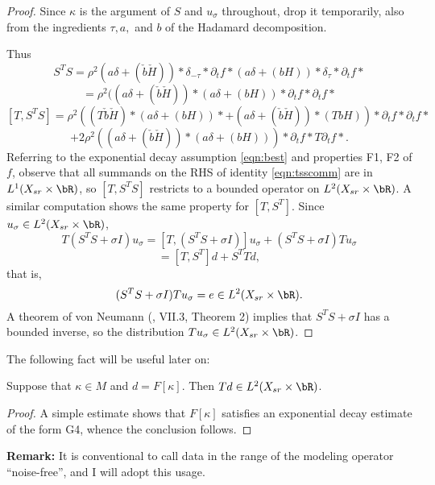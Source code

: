 \begin{proof}
  Since $\kappa$ is the argument of $S$ and $u_{\sigma}$ throughout, drop it
  temporarily, also from the ingredients $\tau, a, $ and $b$ of the
  Hadamard decomposition.
  
  Thus
  \[
    S^TS =
    \rho^2(a\delta  +  (\check{b}\check{H})) *\delta_{-\tau}*\partial_t
    f * (a\delta  +  (bH)) *\delta_{\tau}*\partial_t f*
  \]
  \[
    = \rho^2((a\delta  +  (\check{b}\check{H}))*(a\delta  +
    (bH))*\partial_t f *\partial_t f*
  \]
  \[
    [T,S^TS] = \rho^2((T\check{b}\check{H}) *(a\delta  +
    (bH))*+ (a\delta  +  (\check{b}\check{H}))*(TbH))*\partial_t f
    *\partial_t f*
  \]
  \begin{equation}
    \label{eqn:tsscomm}
    +2\rho^2((a\delta  +  (\check{b}\check{H}))*(a\delta  +
    (bH)))* \partial_t f  *T\partial_t f*.
  \end{equation}
  Referring to the exponential decay assumption \ref{eqn:best}
  and properties F1, F2 of $f$, 
  observe that all summands on the RHS of identity \ref{eqn:tsscomm} are in
  $L^1(X_{sr} \times \bR)$, so $[T,S^TS]$ restricts to a bounded
  operator on $L^2(X_{sr}\times \bR)$. A similar computation shows the
  same property for $[T,S^T]$. Since $u_{\sigma} \in L^2(X_{sr}\times
  \bR)$,
  \[
    T(S^TS+\sigma I)u_{\sigma} =  [T,(S^TS+\sigma I)]u_{\sigma} +
    (S^TS+\sigma I)Tu_{\sigma}
  \]
  \[
    = [T,S^T]d + S^TTd,
  \]
  that is,
  \[
    (S^TS+\sigma I)Tu_{\sigma} = e \in L^2(X_{sr} \times \bR).
  \]
  A theorem of von Neumann (\cite{Yosida}, VII.3, Theorem 2) implies
  that $S^TS+\sigma I$ has a bounded inverse, so the distribution
  $Tu_{\sigma} \in L^2(X_{sr} \times \bR)$.
\end{proof}

The following fact will be useful later on:

\begin{prop}
  \label{thm:noisefree}
  Suppose that $\kappa \in M$ and $d = F[\kappa]$. Then $Td
  \in L^2(X_{sr} \times \bR)$.
\end{prop}

\begin{proof}
  A simple estimate shows that $F[\kappa]$ satisfies an exponential
  decay estimate of the form G4, whence the conclusion follows.
\end{proof}

{\bf Remark:} It is conventional to call data in the range of the
modeling operator ``noise-free'', and I will adopt this usage.

